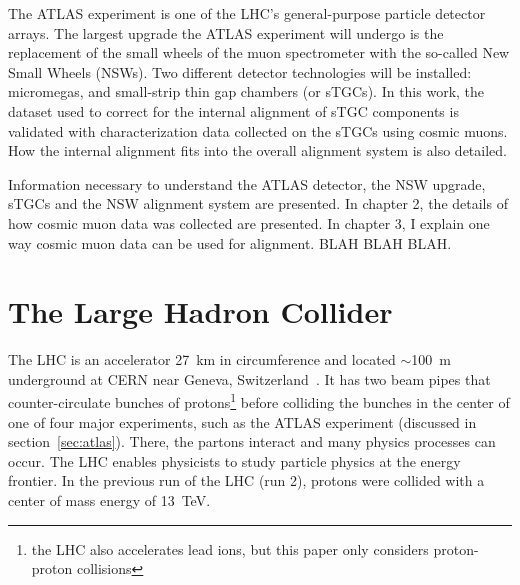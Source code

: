 The ATLAS experiment is one of the LHC's general-purpose particle detector arrays. The largest upgrade the ATLAS experiment will undergo is the replacement of the small wheels of the muon spectrometer with the so-called New Small Wheels (NSWs). Two different detector technologies will be installed: micromegas, and small-strip thin gap chambers (or sTGCs). In this work, the dataset used to correct for the internal alignment of sTGC components is validated with characterization data collected on the sTGCs using cosmic muons. How the internal alignment fits into the overall alignment system is also detailed. 

Information necessary to understand the ATLAS detector, the NSW upgrade, sTGCs and the NSW alignment system are presented. In chapter 2, the details of how cosmic muon data was collected are presented. In chapter 3, I explain one way cosmic muon data can be used for alignment. BLAH BLAH BLAH. 

\section{The Large Hadron Collider}

The LHC is an accelerator \SI{27}{\kilo\meter} in circumference and located $\sim$\SI{100}{\meter} underground at CERN near Geneva, Switzerland~\cite{evans_lhc_2008}. It has two beam pipes that counter-circulate bunches of protons\footnote{the LHC also accelerates lead ions, but this paper only considers proton-proton collisions} before colliding the bunches in the center of one of four major experiments, such as the ATLAS experiment (discussed in section~\ref{sec:atlas}). There, the partons interact and many physics processes can occur. The LHC enables physicists to study particle physics at the energy frontier. In the previous run of the LHC (run 2), protons were collided with a center of mass energy of \SI{13}{\tera\electronvolt}. 



